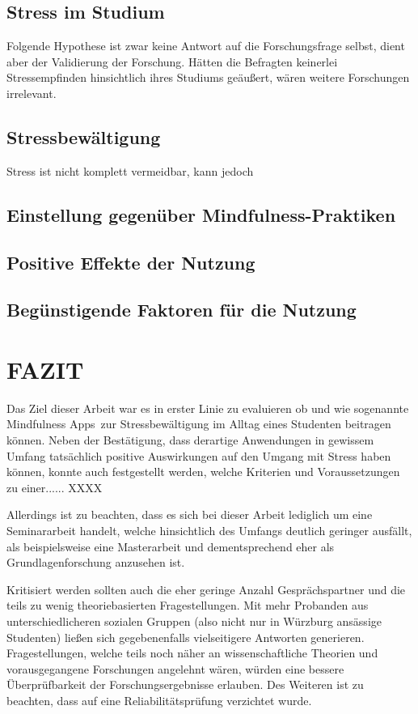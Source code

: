 \documentclass[10pt]{article}
\begin{document}
\subsection{Stress im Studium}
Folgende Hypothese ist zwar keine Antwort auf die Forschungsfrage selbst, dient aber der Validierung der Forschung. Hätten die Befragten keinerlei Stressempfinden hinsichtlich ihres Studiums geäußert, wären weitere Forschungen irrelevant.



\subsection{Stressbewältigung}
Stress ist nicht komplett vermeidbar, kann jedoch 
\subsection{Einstellung gegenüber Mindfulness-Praktiken}
\subsection{Positive Effekte der Nutzung}
\subsection{Begünstigende Faktoren für die Nutzung}


\section{FAZIT}
Das Ziel dieser Arbeit war  es in erster Linie zu evaluieren ob und wie sogenannte \grqq Mindfulness Apps\grqq\ zur Stressbewältigung im Alltag eines Studenten beitragen können. 
Neben der Bestätigung, dass derartige Anwendungen in gewissem Umfang tatsächlich positive Auswirkungen auf den Umgang mit Stress haben können, konnte auch festgestellt werden, welche Kriterien und Voraussetzungen zu einer...... XXXX

Allerdings ist zu beachten, dass es sich bei dieser Arbeit lediglich um eine Seminararbeit handelt, welche hinsichtlich des Umfangs deutlich geringer ausfällt, als beispielsweise eine Masterarbeit und dementsprechend eher als Grundlagenforschung anzusehen ist. 

Kritisiert werden sollten auch die eher geringe Anzahl Gesprächspartner und die teils zu wenig theoriebasierten  Fragestellungen. Mit mehr Probanden aus unterschiedlicheren sozialen Gruppen (also nicht nur in Würzburg ansässige Studenten) ließen sich gegebenenfalls vielseitigere Antworten generieren. Fragestellungen, welche teils noch näher an wissenschaftliche Theorien und vorausgegangene Forschungen angelehnt wären, würden eine bessere Überprüfbarkeit der Forschungsergebnisse erlauben. Des Weiteren ist zu beachten, dass auf eine Reliabilitätsprüfung verzichtet wurde.
\end{document}
